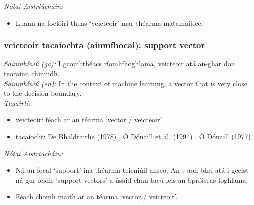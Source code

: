  \noindent \textit{Nótaí Aistriúcháin:}
\begin{itemize}
	\item Luann na foclóirí thuas `veicteoir' mar théarma matamaitice.
\end{itemize}


\subsubsection*{veicteoir tacaíochta (ainmfhocal): support vector}
 \noindent \textit{Sainmhíniú (ga):} I gcomhthéacs ríomhfhoghlama, veicteoir atá an-ghar don teorainn chinnidh.
\\
 \noindent \textit{Sainmhíniú (en):} In the context of machine learning, a vector that is very close to the decision boundary.
\\
 \noindent \textit{Tagairtí:}
\begin{itemize}
	\item veicteoir: féach ar an téarma `vector / veicteoir'
	\item tacaíocht: De Bhaldraithe (1978) \cite{de-bhaldraithe}, Ó Dónaill et al. (1991) \cite{focloir-beag}, Ó Dónaill (1977) \cite{odonaill}
\end{itemize}

 \noindent \textit{Nótaí Aistriúcháin:}
\begin{itemize}
	\item Níl an focal `support' ina théarma teicniúil anseo. An t-aon bhrí atá i gceist ná gur féidir `support vectors' a úsáid chun tacú leis an bpróiseas foghlama.
	\item Féach chomh maith ar an téarma `vector / veicteoir'.
\end{itemize}



